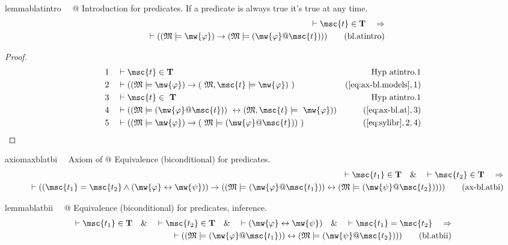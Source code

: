 \begin{restatable}{lemma}{blatintro}~~ @ Introduction for predicates.
   If a predicate is always true it's true at any time.
\begin{align}
\vdash \msc{t} \in \mathbf{T}\quad\Rightarrow \notag \\ 
	\quad \vdash ( ( \mathfrak{M}
    \models \mw{\varphi} ) \rightarrow ( \mathfrak{M} \models ( \mw{\varphi} @
    \msc{t} ) ) )\label{eq:bl.atintro}\tag{bl.atintro}
\end{align}
\end{restatable}

\begin{proof}
\begin{align}
  1 &&  & \vdash \msc{t} \in \mathbf{T}&\text{Hyp~atintro.1}\notag%
  \\ 2 &&  & \vdash ( ( \mathfrak{M} \models \mw{\varphi} ) \rightarrow (
     ~\mathfrak{M} , \msc{t} \models \mw{\varphi} )
     ~)&(\mbox{\ref{eq:ax-bl.models}},1)\notag
  \\ 3 &&  & \vdash \msc{t} \in
     ~\mathbf{T}&\text{Hyp~atintro.1}\notag%
  \\ 4 &&  & \vdash ( ( \mathfrak{M} \models ( \mw{\varphi} @ \msc{t} ) )
     ~\leftrightarrow ( \mathfrak{M} , \msc{t} \models
     ~\mw{\varphi} ) )&(\mbox{\ref{eq:ax-bl.at}},3)\notag
  \\ 5 &&  & \vdash ( ( \mathfrak{M} \models \mw{\varphi} ) \rightarrow (
     ~\mathfrak{M} \models ( \mw{\varphi} @ \msc{t} ) )
     ~)&(\mbox{\ref{eq:sylibr}},2,4)\notag
\end{align}
\end{proof}

\begin{restatable}{axiom}{axblatbi}~~ Axiom of @ Equivalence (biconditional) for
predicates.
\begin{align}
\vdash \msc{t_1} \in \mathbf{T}\quad\&\quad \vdash \msc{t_2} \in
    \mathbf{T}\quad\Rightarrow \notag \\ 
	\quad \vdash ( ( \msc{t_1} = \msc{t_2} \wedge (
    \mw{\varphi} \leftrightarrow \mw{\psi} ) ) \rightarrow ( ( \mathfrak{M}
    \models ( \mw{\varphi} @ \msc{t_1} ) ) \leftrightarrow ( \mathfrak{M}
    \models ( \mw{\psi} @ \msc{t_2} ) ) )
    )\label{eq:ax-bl.atbi}\tag{ax-bl.atbi}
\end{align}
\end{restatable}

\begin{restatable}{lemma}{blatbii}~~ @ Equivalence (biconditional) for
predicates, inference.
\begin{align}
\vdash \msc{t_1} \in \mathbf{T}\quad\&\quad \vdash \msc{t_2} \in
    \mathbf{T}\quad\&\quad \vdash ( \mw{\varphi} \leftrightarrow \mw{\psi}
    )\quad\&\quad \vdash \msc{t_1} = \msc{t_2}\quad\Rightarrow \notag \\ 
	\quad \vdash ( (
    \mathfrak{M} \models ( \mw{\varphi} @ \msc{t_1} ) ) \leftrightarrow (
    \mathfrak{M} \models ( \mw{\psi} @ \msc{t_2} ) )
    )\label{eq:bl.atbii}\tag{bl.atbii}
\end{align}
\end{restatable}

